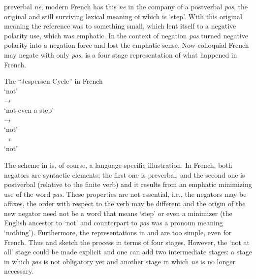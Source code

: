 ﻿\documentclass[output=paper]{langsci/langscibook}
\begin{document}
preverbal \textit{ne}, modern French has this \textit{ne} in the company of
a postverbal \textit{pas}, the original and still surviving lexical meaning
of which is `step'. With this original meaning the reference was to
something small, which lent itself to a negative polarity use, which was
emphatic. In the context of negation \textit{pas} turned negative polarity
into a negation force and lost the emphatic sense. Now colloquial French
may negate with only \textit{pas}.  is a four stage
representation of what happened in French.
%
\begin{exe}\ex\label{ex:int-jespersen-french}
          The ``Jespersen Cycle'' in French\\[1ex]
           `not'      \\
    →                      \\
      `not even a step'  \\
    →                                          \\
      `not'              \\
    →                                          \\
                `not'              
  \end{exe}
%
The scheme in  is, of course, a
language-specific illustration. In French, both negators are syntactic
elements; the first one is preverbal, and the second one is postverbal
(relative to the finite verb) and it results from an emphatic minimizing
use of the word \textit{pas}. These properties are not essential, i.e., the
negators may be affixes, the order with respect to the verb may be
different and the origin of the new negator need not be a word that means
`step' or even a minimizer (the English ancestor to `not' and counterpart
to \textit{pas} was a pronoun meaning `nothing'). Furthermore, the
representations in  and 
are too simple, even for French. Thus  and
 sketch the process in
terms of four stages. However, the `not at all' stage could be made
explicit and one can add two intermediate stages: a stage in which
\textit{pas} is not obligatory yet and another stage in which \textit{ne}
is no longer necessary. 
\end{document}
